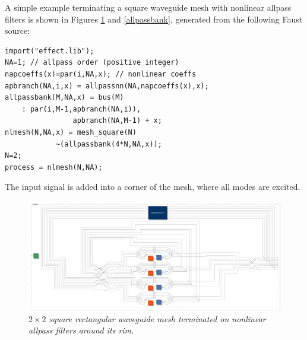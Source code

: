 \documentclass[twoside,a4paper]{article}
\begin{document}
A simple example terminating a square waveguide mesh with nonlinear
allpass filters is shown in Figures \ref{meshc} and \ref{allpassbank},
generated from the following Faust source:
\begin{verbatim}
import("effect.lib");
NA=1; // allpass order (positive integer)
napcoeffs(x)=par(i,NA,x); // nonlinear coeffs
apbranch(NA,i,x) = allpassnn(NA,napcoeffs(x),x);
allpassbank(M,NA,x) = bus(M)
    : par(i,M-1,apbranch(NA,i)), 
                apbranch(NA,M-1) + x;
nlmesh(N,NA,x) = mesh_square(N)
            ~(allpassbank(4*N,NA,x));
N=2; 
process = nlmesh(N,NA);
\end{verbatim}
The input signal is added into a corner of the mesh, where all modes
are excited.

\begin{figure}[ht]
\center
\includegraphics[width=6.5in]{fig/meshc.pdf}
\caption{\label{meshc}{\it $2\times2$ square rectangular
    waveguide mesh terminated on nonlinear allpass filters around its
    rim.}}
\end{figure} 
\end{document}
